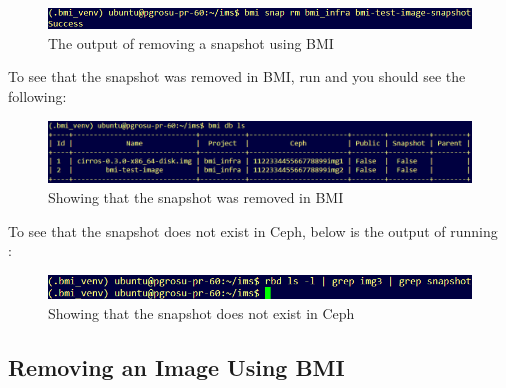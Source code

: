 

\begin{figure}[!h] %
\label{fig:bmi-workflow}
\begin{center}
\includegraphics[scale=0.7]{figures/bmi-snapshot-remove.png}
\end{center}
\caption{The output of removing a snapshot using BMI}
\end{figure}

To see that the snapshot was removed in BMI, run  and you should see the following: \\

\begin{figure}[!h] %
\label{fig:bmi-workflow}
\begin{center}
\includegraphics[scale=0.7]{figures/bmi-snapshot-remove-db-ls.png}
\end{center}
\caption{Showing that the snapshot was removed in BMI}
\end{figure}


To see that the snapshot does not exist in Ceph, below is the output of running \\
: \\

\begin{figure}[!h] %
\label{fig:bmi-workflow}
\begin{center}
\includegraphics[scale=0.7]{figures/rbd-ls-snapshot-removed.png}
\end{center}
\caption{Showing that the snapshot does not exist in Ceph}
\end{figure}



\subsection{Removing an Image Using BMI}

